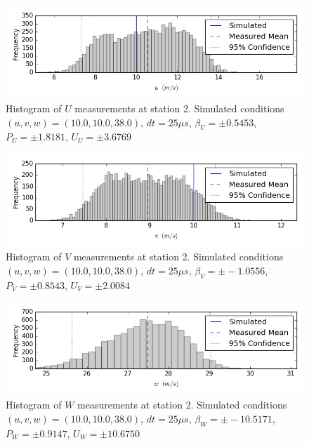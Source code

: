 \begin{figure}[H]
\centering
\includegraphics[width=6in]{figs/Ely_May28th02004/uncertainty_Ely_May28th02004_U}
\caption{Histogram of $U$ measurements at station 2. Simulated conditions $(u,v,w)=(10.0, 10.0, 38.0)$, $dt=25 \mu s$, $\beta_U=\pm 0.5453$, $P_U=\pm 1.8181$, $U_U=\pm 3.6769$}
\label{fig:uncertainty_Ely_May28th02004_U}
\end{figure}


\begin{figure}[H]
\centering
\includegraphics[width=6in]{figs/Ely_May28th02004/uncertainty_Ely_May28th02004_V}
\caption{Histogram of $V$ measurements at station 2. Simulated conditions $(u,v,w)=(10.0, 10.0, 38.0)$, $dt=25 \mu s$, $\beta_V=\pm -1.0556$, $P_V=\pm 0.8543$, $U_V=\pm 2.0084$}
\label{fig:uncertainty_Ely_May28th02004_V}
\end{figure}


\begin{figure}[H]
\centering
\includegraphics[width=6in]{figs/Ely_May28th02004/uncertainty_Ely_May28th02004_W}
\caption{Histogram of $W$ measurements at station 2. Simulated conditions $(u,v,w)=(10.0, 10.0, 38.0)$, $dt=25 \mu s$, $\beta_W=\pm -10.5171$, $P_W=\pm 0.9147$, $U_W=\pm 10.6750$}
\label{fig:uncertainty_Ely_May28th02004_W}
\end{figure}


